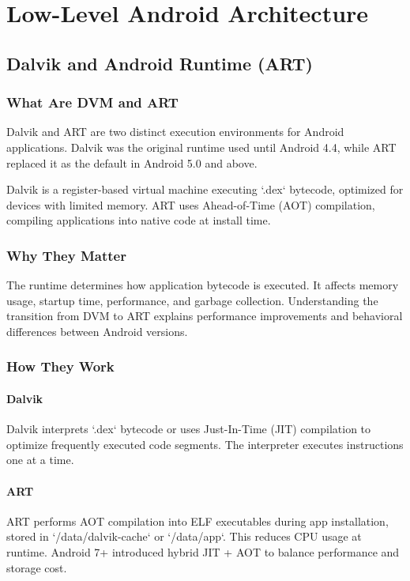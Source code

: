 \documentclass[a4paper,12pt]{article}
\begin{document}
\section{Low-Level Android Architecture}

\subsection{Dalvik and Android Runtime (ART)}

\subsubsection{What Are DVM and ART}

Dalvik and ART are two distinct execution environments for Android applications. Dalvik was the original runtime used until Android 4.4, while ART replaced it as the default in Android 5.0 and above.

Dalvik is a register-based virtual machine executing `.dex` bytecode, optimized for devices with limited memory. ART uses Ahead-of-Time (AOT) compilation, compiling applications into native code at install time.

\subsubsection{Why They Matter}

The runtime determines how application bytecode is executed. It affects memory usage, startup time, performance, and garbage collection. Understanding the transition from DVM to ART explains performance improvements and behavioral differences between Android versions.

\subsubsection{How They Work}

\paragraph{Dalvik}
Dalvik interprets `.dex` bytecode or uses Just-In-Time (JIT) compilation to optimize frequently executed code segments. The interpreter executes instructions one at a time.

\paragraph{ART}
ART performs AOT compilation into ELF executables during app installation, stored in `/data/dalvik-cache` or `/data/app`. This reduces CPU usage at runtime. Android 7+ introduced hybrid JIT + AOT to balance performance and storage cost.
\end{document}
